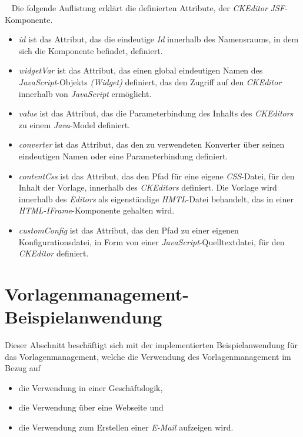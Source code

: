 \ \newline
Die folgende Auflistung erklärt die definierten Attribute, der \emph{CKEditor} \emph{JSF}-Komponente.
\begin{itemize}
	\item\emph{id} 
	\newline
	ist das Attribut, das die eindeutige \emph{Id} innerhalb des Namensraums, in dem sich die Komponente befindet, definiert.
	\item\emph{widgetVar}
	\newline
	ist das Attribut, das einen global eindeutigen Namen des \emph{JavaScript}-Objekts \emph{(Widget)} definiert, das den Zugriff auf den \emph{CKEditor} innerhalb von \emph{JavaScript} ermöglicht.
	\item\emph{value}
	\newline
	ist das Attribut, das die Parameterbindung des Inhalts des \emph{CKEditors} zu einem \emph{Java}-Model definiert.
	\item\emph{converter}
	\newline
	ist das Attribut, das den zu verwendeten Konverter über seinen eindeutigen Namen oder eine Parameterbindung definiert.
	\item\emph{contentCss}
	\newline
	ist das Attribut, das den Pfad für eine eigene \emph{CSS}-Datei, für den Inhalt der Vorlage, innerhalb des \emph{CKEditors} definiert. Die Vorlage wird innerhalb des \emph{Editors} als eigenständige \emph{HMTL}-Datei behandelt, das in einer \emph{HTML-IFrame}-Komponente gehalten wird.
	\item\emph{customConfig}
	\newline
	ist das Attribut, das den Pfad zu einer eigenen Konfigurationsdatei, in Form von einer \emph{JavaScript}-Quelltextdatei, für den \emph{CKEditor} definiert.
\end{itemize}

\section{Vorlagenmanagement-Beispielanwendung}
Dieser Abschnitt beschäftigt sich mit der implementierten Beispielanwendung für das Vorlagenmanagement, welche die Verwendung des Vorlagenmanagement im Bezug auf 
\begin{itemize}
	\item die Verwendung in einer Geschäftslogik,
	\item die Verwendung über eine Webseite und
	\item die Verwendung zum Erstellen einer \emph{E-Mail} aufzeigen wird. 
\end{itemize}

